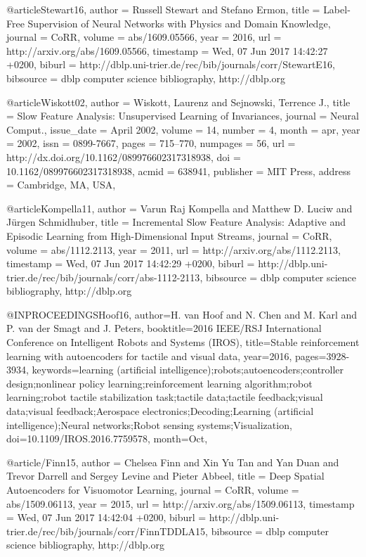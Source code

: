 @article{Stewart16,
  author    = {Russell Stewart and
               Stefano Ermon},
  title     = {Label-Free Supervision of Neural Networks with Physics and Domain
               Knowledge},
  journal   = {CoRR},
  volume    = {abs/1609.05566},
  year      = {2016},
  url       = {http://arxiv.org/abs/1609.05566},
  timestamp = {Wed, 07 Jun 2017 14:42:27 +0200},
  biburl    = {http://dblp.uni-trier.de/rec/bib/journals/corr/StewartE16},
  bibsource = {dblp computer science bibliography, http://dblp.org}
}

@article{Wiskott02,
 author = {Wiskott, Laurenz and Sejnowski, Terrence J.},
 title = {Slow Feature Analysis: Unsupervised Learning of Invariances},
 journal = {Neural Comput.},
 issue_date = {April 2002},
 volume = {14},
 number = {4},
 month = apr,
 year = {2002},
 issn = {0899-7667},
 pages = {715--770},
 numpages = {56},
 url = {http://dx.doi.org/10.1162/089976602317318938},
 doi = {10.1162/089976602317318938},
 acmid = {638941},
 publisher = {MIT Press},
 address = {Cambridge, MA, USA},
}

@article{Kompella11,
  author    = {Varun Raj Kompella and
               Matthew D. Luciw and
               J{\"{u}}rgen Schmidhuber},
  title     = {Incremental Slow Feature Analysis: Adaptive and Episodic Learning
               from High-Dimensional Input Streams},
  journal   = {CoRR},
  volume    = {abs/1112.2113},
  year      = {2011},
  url       = {http://arxiv.org/abs/1112.2113},
  timestamp = {Wed, 07 Jun 2017 14:42:29 +0200},
  biburl    = {http://dblp.uni-trier.de/rec/bib/journals/corr/abs-1112-2113},
  bibsource = {dblp computer science bibliography, http://dblp.org}
}

@INPROCEEDINGS{Hoof16,
author={H. van Hoof and N. Chen and M. Karl and P. van der Smagt and J. Peters},
booktitle={2016 IEEE/RSJ International Conference on Intelligent Robots and Systems (IROS)},
title={Stable reinforcement learning with autoencoders for tactile and visual data},
year={2016},
pages={3928-3934},
keywords={learning (artificial intelligence);robots;autoencoders;controller design;nonlinear policy learning;reinforcement learning algorithm;robot learning;robot tactile stabilization task;tactile data;tactile feedback;visual data;visual feedback;Aerospace electronics;Decoding;Learning (artificial intelligence);Neural networks;Robot sensing systems;Visualization},
doi={10.1109/IROS.2016.7759578},
month={Oct},}

@article{/Finn15,
  author    = {Chelsea Finn and
               Xin Yu Tan and
               Yan Duan and
               Trevor Darrell and
               Sergey Levine and
               Pieter Abbeel},
  title     = {Deep Spatial Autoencoders for Visuomotor Learning},
  journal   = {CoRR},
  volume    = {abs/1509.06113},
  year      = {2015},
  url       = {http://arxiv.org/abs/1509.06113},
  timestamp = {Wed, 07 Jun 2017 14:42:04 +0200},
  biburl    = {http://dblp.uni-trier.de/rec/bib/journals/corr/FinnTDDLA15},
  bibsource = {dblp computer science bibliography, http://dblp.org}
}
